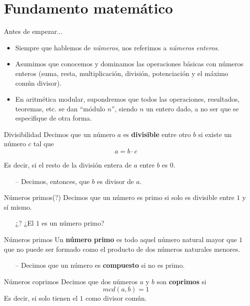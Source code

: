 \documentclass[10pt]{beamer} %
\begin{document}
\section{Fundamento matemático}
\begin{frame}{Antes de empezar...}
    \begin{itemize}
        \item Siempre que hablemos de \textit{números}, nos referimos a \textit{números enteros}.
        \item Asumimos que conocemos y dominamos las operaciones básicas con números enteros (suma, resta, multiplicación, división, potenciación y el máximo común divisor).
        \item En aritmética modular, supondremos que todos las operaciones, resultados, teoremas, etc. se dan ``módulo $n$'', siendo $n$ un entero dado, a no ser que se especifique de otra forma.
    \end{itemize}
\end{frame}
\begin{frame}{Divisibilidad}
    Decimos que un número $a$ es \textbf{divisible} entre otro $b$ si existe un número $c$ tal que \[a=b\cdot c\]\par
    Es decir, si el resto de la división entera de $a$ entre $b$ es $0$.
    \begin{itemize}
        \item[--] Decimos, entonces, que $b$ es divisor de $a$.
    \end{itemize}
\end{frame}
\begin{frame}{Números primos(?)}
    Decimos que un número es primo si solo es divisible entre $1$ y sí mismo.
    \begin{itemize}
        \item[¿?] ¿El $1$ es un número primo?
    \end{itemize}
\end{frame}
\begin{frame}{Números primos}
    Un \textbf{número primo} es todo aquel número natural mayor que $1$ que no puede ser formado como el producto de dos números naturales menores.
    \begin{itemize}
        \item[--] Decimos que un número es \textbf{compuesto} si no es primo.
    \end{itemize}
\end{frame}
\begin{frame}{Números coprimos}
    Decimos que dos números $a$ y $b$ son \textbf{coprimos} si \[mcd(a, b) = 1\]
    Es decir, si solo tienen el $1$ como divisor común.
\end{frame}
\end{document}
